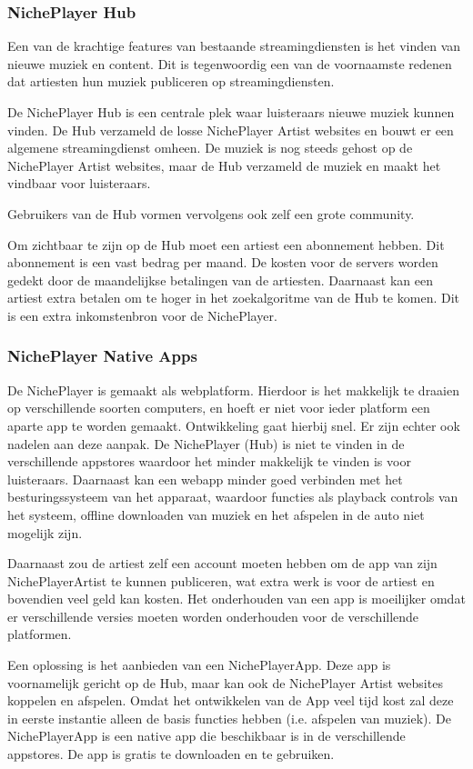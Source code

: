 \subsubsection*{NichePlayer Hub}
Een van de krachtige features van bestaande streamingdiensten is het vinden van nieuwe muziek en content. Dit is tegenwoordig een van de voornaamste redenen dat artiesten hun muziek publiceren op streamingdiensten.

De NichePlayer Hub is een centrale plek waar luisteraars nieuwe muziek kunnen vinden. De Hub verzameld de losse NichePlayer Artist websites en bouwt er een algemene streamingdienst omheen. De muziek is nog steeds gehost op de NichePlayer Artist websites, maar de Hub verzameld de muziek en maakt het vindbaar voor luisteraars.

Gebruikers van de Hub vormen vervolgens ook zelf een grote community. 

Om zichtbaar te zijn op de Hub moet een artiest een abonnement hebben. Dit abonnement is een vast bedrag per maand. De kosten voor de servers worden gedekt door de maandelijkse betalingen van de artiesten. Daarnaast kan een artiest extra betalen om te hoger in het zoekalgoritme van de Hub te komen. Dit is een extra inkomstenbron voor de NichePlayer.

\subsubsection*{NichePlayer Native Apps}
De NichePlayer is gemaakt als webplatform. Hierdoor is het makkelijk te draaien op verschillende soorten computers, en hoeft er niet voor ieder platform een aparte app te worden gemaakt. Ontwikkeling gaat hierbij snel. Er zijn echter ook nadelen aan deze aanpak. De NichePlayer (Hub) is niet te vinden in de verschillende appstores waardoor het minder makkelijk te vinden is voor luisteraars. Daarnaast kan een webapp minder goed verbinden met het besturingssysteem van het apparaat, waardoor functies als playback controls van het systeem, offline downloaden van muziek en het afspelen in de auto niet mogelijk zijn.

Daarnaast zou de artiest zelf een account moeten hebben om de app van zijn NichePlayerArtist te kunnen publiceren, wat extra werk is voor de artiest en bovendien veel geld kan kosten. Het onderhouden van een app is moeilijker omdat er verschillende versies moeten worden onderhouden voor de verschillende platformen.

Een oplossing is het aanbieden van een NichePlayerApp. Deze app is voornamelijk gericht op de Hub, maar kan ook de NichePlayer Artist websites koppelen en afspelen. Omdat het ontwikkelen van de App veel tijd kost zal deze in eerste instantie alleen de basis functies hebben (i.e. afspelen van muziek). De NichePlayerApp is een native app die beschikbaar is in de verschillende appstores. De app is gratis te downloaden en te gebruiken.

